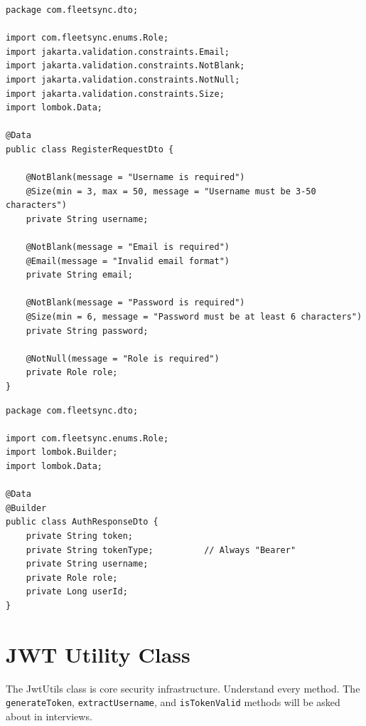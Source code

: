 \documentclass[12pt,a4paper]{report}
\newcommand{\code}[1]{\texttt{\textcolor{keywordblue}{#1}}}
\begin{document}
\begin{lstlisting}[caption=RegisterRequestDto.java]
package com.fleetsync.dto;

import com.fleetsync.enums.Role;
import jakarta.validation.constraints.Email;
import jakarta.validation.constraints.NotBlank;
import jakarta.validation.constraints.NotNull;
import jakarta.validation.constraints.Size;
import lombok.Data;

@Data
public class RegisterRequestDto {

    @NotBlank(message = "Username is required")
    @Size(min = 3, max = 50, message = "Username must be 3-50 characters")
    private String username;

    @NotBlank(message = "Email is required")
    @Email(message = "Invalid email format")
    private String email;

    @NotBlank(message = "Password is required")
    @Size(min = 6, message = "Password must be at least 6 characters")
    private String password;

    @NotNull(message = "Role is required")
    private Role role;
}
\end{lstlisting}

\begin{lstlisting}[caption=AuthResponseDto.java]
package com.fleetsync.dto;

import com.fleetsync.enums.Role;
import lombok.Builder;
import lombok.Data;

@Data
@Builder
public class AuthResponseDto {
    private String token;
    private String tokenType;          // Always "Bearer"
    private String username;
    private Role role;
    private Long userId;
}
\end{lstlisting}

\section{JWT Utility Class}

\begin{tcolorbox}[handbox]
The JwtUtils class is core security infrastructure. Understand every method. The \code{generateToken}, \code{extractUsername}, and \code{isTokenValid} methods will be asked about in interviews.
\end{tcolorbox}
\end{document}
